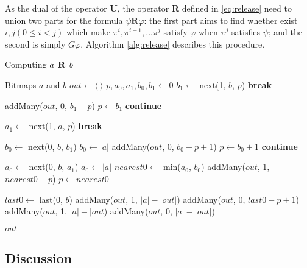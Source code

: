 As the dual of the operator \textbf{U}, the operator \textbf{R} defined in \eqref{eq:release} need to union two parts for the formula $\psi \textbf{R} \varphi$: the first part aims to find whether exist $i, j (0 \leq i < j)$ which make $\pi^i, \pi^{i + 1}, ... \pi^j$ satisfy $\varphi$ when $\pi^j$ satisfies $\psi$; and the second is simply $G\varphi$. Algorithm \ref{alg:release} describes this procedure.

\begin{algorithm}
\caption{Computing $a \mathrel{\mbox{\,\textbf{R}}}\, b$}
\label{alg:release}
\begin{multicols}{2}
\begin{algorithmic}[1]
\Require Bitmaps $a$ and $b$
\State $out \gets \langle~\rangle$
\State $p, a_0, a_1, b_0, b_1 \gets 0$
    \State $b_1 \gets$ next(1, $b$, $p$)
  \EndIf
    \State \textbf{break}
  \EndIf

    \State addMany($out$, 0, $b_1 - p$)
    \State $p \gets b_1$
    \State \textbf{continue}
  \EndIf

    \State $a_1 \gets$ next(1, $a$, $p$)
  \EndIf
    \State \textbf{break}
  \EndIf

    \State $b_0 \gets$ next(0, $b$, $b_1$)
      \State $b_0 \gets |a|$
    \EndIf
  \EndIf
    \State addMany($out$, 0, $b_0 - p + 1$)
    \State $p \gets b_0 + 1$
    \State \textbf{continue}
  \EndIf

    \State $a_0 \gets$ next(0, $b$, $a_1$)
      \State $a_0 \gets |a|$
    \EndIf
  \EndIf
  \State $nearest0 \gets$ min($a_0$, $b_0$)
  \State addMany($out$, 1, $nearest0 - p$)
  \State $p \gets nearest0$
\EndWhile

  \State $last0 \gets$ last(0, $b$)
    \State addMany($out$, 1, $|a| - |out|$)
  \Else
    \State addMany($out$, 0, $last0 - p + 1$)
    \State addMany($out$, 1, $|a| - |out$)
  \EndIf
\Else
  \State addMany($out$, 0, $|a| - |out|$)
\EndIf

\State \Return $out$
\end{algorithmic}
\end{multicols}
\end{algorithm}

\subsection{Discussion}

